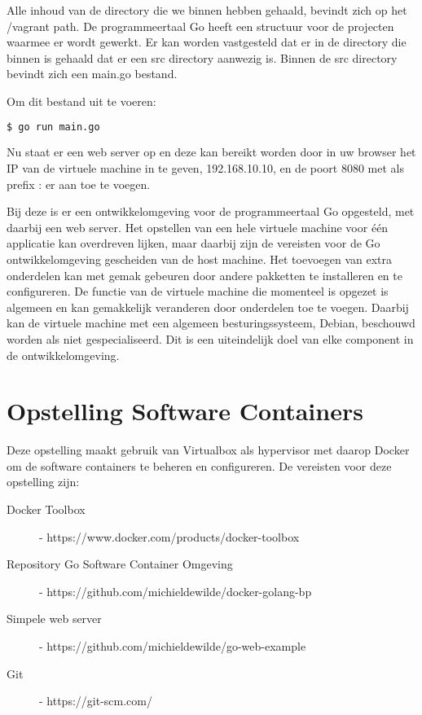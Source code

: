 Alle inhoud van de directory die we binnen hebben gehaald, bevindt zich op het /vagrant path. De programmeertaal Go heeft een structuur voor de projecten waarmee er wordt gewerkt. Er kan worden vastgesteld dat er in de directory die binnen is gehaald dat er een src directory aanwezig is. Binnen de src directory bevindt zich een main.go bestand. 

\noindent Om dit bestand uit te voeren:
\begin{lstlisting}[language=bash]
  $ go run main.go
\end{lstlisting}

Nu staat er een web server op en deze kan bereikt worden door in uw browser het IP van de virtuele machine in te geven, 192.168.10.10, en de poort 8080 met als prefix : er aan toe te voegen.

Bij deze is er een ontwikkelomgeving voor de programmeertaal Go opgesteld, met daarbij een web server. Het opstellen van een hele virtuele machine voor één applicatie kan overdreven lijken, maar daarbij zijn de vereisten voor de Go ontwikkelomgeving gescheiden van de host machine. Het toevoegen van extra onderdelen kan met gemak gebeuren door andere pakketten te installeren en te configureren. De functie van de virtuele machine die momenteel is opgezet is algemeen en kan gemakkelijk veranderen door onderdelen toe te voegen. Daarbij kan de virtuele machine met een algemeen besturingssysteem, Debian, beschouwd worden als niet gespecialiseerd. Dit is een uiteindelijk doel van elke component in de ontwikkelomgeving. 

\section{Opstelling Software Containers}

Deze opstelling maakt gebruik van Virtualbox als hypervisor met daarop Docker om de software containers te beheren en configureren.
De vereisten voor deze opstelling zijn:
\begin{description}
\item [Docker Toolbox] - https://www.docker.com/products/docker-toolbox
\item [Repository Go Software Container Omgeving] - https://github.com/michieldewilde/docker-golang-bp
\item [Simpele web server] - https://github.com/michieldewilde/go-web-example
\item [Git] - https://git-scm.com/
\end{description}


